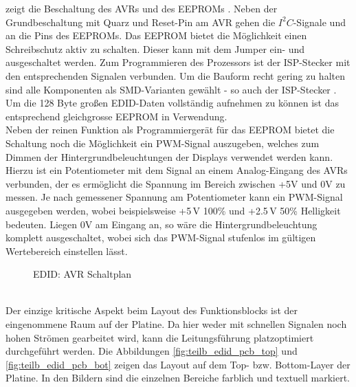  zeigt die Beschaltung des AVRs  und des EEPROMs . Neben der Grundbeschaltung mit Quarz und Reset-Pin am AVR gehen die $I^2C$-Signale  und  an die Pins des EEPROMs. Das EEPROM bietet die Möglichkeit einen Schreibschutz aktiv zu schalten. Dieser kann mit dem Jumper  ein- und ausgeschaltet werden. Zum Programmieren des Prozessors ist der ISP-Stecker mit den entsprechenden Signalen verbunden. Um die Bauform recht gering zu halten sind alle Komponenten als SMD-Varianten gewählt - so auch der ISP-Stecker . Um die 128 Byte großen EDID-Daten vollständig aufnehmen zu können ist das entsprechend gleichgrosse EEPROM  in Verwendung. \\
Neben der reinen Funktion als Programmiergerät für das EEPROM bietet die Schaltung noch die Möglichkeit ein PWM-Signal auszugeben, welches zum Dimmen der Hintergrundbeleuchtungen der Displays verwendet werden kann. Hierzu ist ein Potentiometer mit dem Signal  an einem Analog-Eingang des AVRs verbunden, der es ermöglicht die Spannung im Bereich zwischen +5V und 0V zu messen. Je nach gemessener Spannung am Potentiometer kann ein PWM-Signal  ausgegeben werden, wobei beispielsweise +5\,V 100\%  und +2.5\,V 50\% Helligkeit bedeuten. Liegen 0V am Eingang an, so wäre die Hintergrundbeleuchtung komplett ausgeschaltet, wobei sich das PWM-Signal stufenlos im gültigen Wertebereich einstellen lässt. 
\begin{figure}[htp]
	\center
    \caption{EDID: AVR Schaltplan}
    \label{fig:teilb_edid_avr_sch}
\end{figure}\\
Der einzige kritische Aspekt beim Layout des Funktionsblocks ist der eingenommene Raum auf der Platine. Da hier weder mit schnellen Signalen noch hohen Strömen gearbeitet wird, kann die Leitungsführung platzoptimiert durchgeführt werden. Die Abbildungen \ref{fig:teilb_edid_pcb_top} und \ref{fig:teilb_edid_pcb_bot} zeigen das Layout auf dem Top- bzw. Bottom-Layer der Platine. In den Bildern sind die einzelnen Bereiche farblich und textuell markiert.

